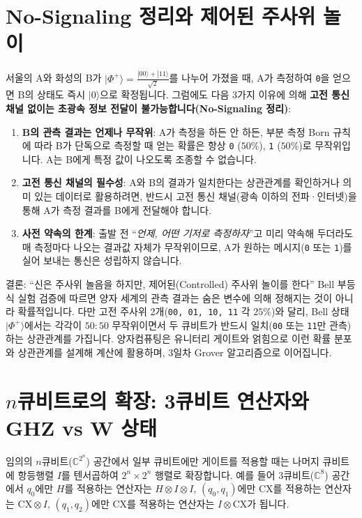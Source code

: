 \documentclass[11pt, a4paper]{article}
\newcommand{\ket}[1]{|#1\rangle}
\theoremstyle{definition}
\begin{document}
\section{No-Signaling 정리와 제어된 주사위 놀이}
서울의 A와 화성의 B가 $\ket{\Phi^+} = \frac{\ket{00}+\ket{11}}{\sqrt{2}}$를 나누어 가졌을 때, A가 측정하여 \texttt{0}을 얻으면 B의 상태도 즉시 $\ket{0}$으로 확정됩니다. 그럼에도 다음 3가지 이유에 의해 \textbf{고전 통신 채널 없이는 초광속 정보 전달이 불가능합니다(No-Signaling 정리)}:

\begin{enumerate}
    \item \textbf{B의 관측 결과는 언제나 무작위}: A가 측정을 하든 안 하든, 부분 측정 Born 규칙에 따라 B가 단독으로 측정할 때 얻는 확률은 항상 \texttt{0} ($50\%$), \texttt{1} ($50\%$)로 무작위입니다. A는 B에게 특정 값이 나오도록 조종할 수 없습니다.
    \item \textbf{고전 통신 채널의 필수성}: A와 B의 결과가 일치한다는 상관관계를 확인하거나 의미 있는 데이터로 활용하려면, 반드시 고전 통신 채널(광속 이하의 전파·인터넷)을 통해 A가 측정 결과를 B에게 전달해야 합니다.
    \item \textbf{사전 약속의 한계}: 출발 전 ``\textit{언제, 어떤 기저로 측정하자}''고 미리 약속해 두더라도 매 측정마다 나오는 결과값 자체가 무작위이므로, A가 원하는 메시지(\texttt{0} 또는 \texttt{1})를 실어 보내는 통신은 성립하지 않습니다.
\end{enumerate}

\begin{notebox}{결론: ``신은 주사위 놀음을 하지만, 제어된(Controlled) 주사위 놀이를 한다''}
Bell 부등식 실험 검증에 따르면 양자 세계의 관측 결과는 숨은 변수에 의해 정해지는 것이 아니라 확률적입니다. 다만 고전 주사위 2개(\texttt{00, 01, 10, 11} 각 $25\%$)와 달리, Bell 상태 $\ket{\Phi^+}$에서는 각각이 $50:50$ 무작위이면서 두 큐비트가 반드시 일치(\texttt{00} 또는 \texttt{11}만 관측)하는 상관관계를 가집니다. 양자컴퓨팅은 유니터리 게이트와 얽힘으로 이런 확률 분포와 상관관계를 설계해 계산에 활용하며, 3일차 Grover 알고리즘으로 이어집니다.
\end{notebox}

\section{\texorpdfstring{$n$}{n}큐비트로의 확장: 3큐비트 연산자와 GHZ vs W 상태}
임의의 $n$큐비트($\mathbb{C}^{2^n}$) 공간에서 일부 큐비트에만 게이트를 적용할 때는 나머지 큐비트에 항등행렬 $I$를 텐서곱하여 $2^n \times 2^n$ 행렬로 확장합니다. 예를 들어 3큐비트($\mathbb{C}^8$) 공간에서 $q_0$에만 $H$를 적용하는 연산자는 $H \otimes I \otimes I$, $(q_0, q_1)$에만 $\mathrm{CX}$를 적용하는 연산자는 $\mathrm{CX} \otimes I$, $(q_1, q_2)$에만 $\mathrm{CX}$를 적용하는 연산자는 $I \otimes \mathrm{CX}$가 됩니다.
\end{document}
